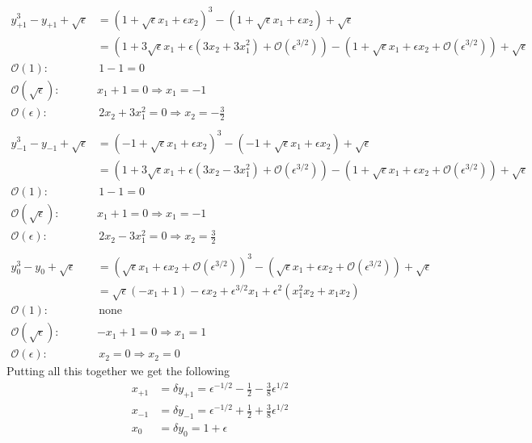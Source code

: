 \documentclass[12pt]{article}
\theoremstyle{remark}
\begin{document}
\begin{align*}
	y_{+1}^3 - y_{+1} + \sqrt{\epsilon} & = (1 + \sqrt{\epsilon}x_1 + \epsilon x_2)^3 - (1 + \sqrt{\epsilon}x_1 + \epsilon x_2) + \sqrt{\epsilon} \\
	& = (1 + 3\sqrt{\epsilon}x_1 + \epsilon(3x_2 + 3x_1^2) + \mathcal{O}(\epsilon^{3/2})) - (1 + \sqrt{\epsilon}x_1 + \epsilon x_2 + \mathcal{O}(\epsilon^{3/2})) + \sqrt{\epsilon} \\
		\mathcal{O}(1): & \, 1 - 1 = 0 \\
		\mathcal{O}(\sqrt{\epsilon}): \,& x_1 + 1 = 0 \Rightarrow x_1 = -1 \\
		\mathcal{O}(\epsilon): &\, 2x_2 + 3x_1^2 = 0 \Rightarrow x_2 = -\frac{3}{2} \\ \\
	y_{-1}^3 - y_{-1} + \sqrt{\epsilon} & = (-1 + \sqrt{\epsilon}x_1 + \epsilon x_2)^3 - (-1 + \sqrt{\epsilon}x_1 + \epsilon x_2) + \sqrt{\epsilon} \\
	& = (1 + 3\sqrt{\epsilon}x_1 + \epsilon(3x_2 - 3x_1^2) + \mathcal{O}(\epsilon^{3/2})) - (1 + \sqrt{\epsilon}x_1 + \epsilon x_2 + \mathcal{O}(\epsilon^{3/2})) + \sqrt{\epsilon} \\
	\mathcal{O}(1): & \, 1 - 1 = 0 \\
	\mathcal{O}(\sqrt{\epsilon}): \,& x_1 + 1 = 0 \Rightarrow x_1 = -1 \\
	\mathcal{O}(\epsilon): &\, 2x_2 - 3x_1^2 = 0 \Rightarrow x_2 = \frac{3}{2} \\ \\
	y_0^3 - y_0 + \sqrt{\epsilon} & = (\sqrt{\epsilon}x_1 + \epsilon x_2 + \mathcal{O}(\epsilon^{3/2}))^3 - (\sqrt{\epsilon}x_1 + \epsilon x_2 + \mathcal{O}(\epsilon^{3/2})) + \sqrt{\epsilon} \\ 
	& = \sqrt{\epsilon}(-x_1 + 1) - \epsilon x_2 +  \epsilon^{3/2}x_1 + \epsilon^2(x_1^2x_2 + x_1x_2) \\
	\mathcal{O}(1): & \, \text{none} \\
	\mathcal{O}(\sqrt{\epsilon}): \,& -x_1 + 1 = 0 \Rightarrow x_1 = 1 \\
	\mathcal{O}(\epsilon): &\, x_2 = 0 \Rightarrow x_2 = 0 
\end{align*}
Putting all this together we get the following
\begin{align*}
x_{+1} & = \delta y_{+1} = \epsilon^{-1/2} - \frac{1}{2} - \frac{3}{8}\epsilon^{1/2} \\
 x_{-1} & = \delta y_{-1} = \epsilon^{-1/2} + \frac{1}{2} + \frac{3}{8}\epsilon^{1/2} \\
 x_0 & = \delta y_0 = 1 + \epsilon
\end{align*}
 \\ \\
\end{document}
